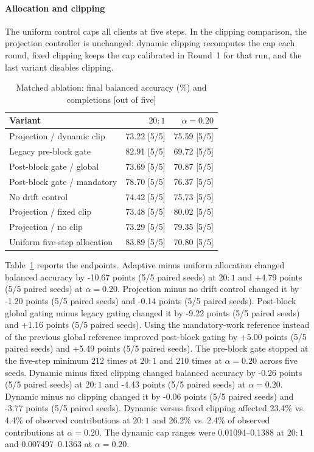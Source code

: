 \documentclass[conference]{IEEEtran}
\begin{document}
\paragraph{Allocation and clipping}
The uniform control caps all clients at five steps. In the clipping comparison, the projection controller is unchanged: dynamic clipping recomputes the cap each round, fixed clipping keeps the cap calibrated in Round~1 for that run, and the last variant disables clipping.
\begin{table}[t]
\caption{Matched ablation: final balanced accuracy (\%) and completions [out of five]}
\label{tab:matched_ablation}
\centering\scriptsize
\setlength{\tabcolsep}{3.8pt}
\begin{tabular}{@{}lrr@{}}\toprule
Variant & $20{:}1$ & $\alpha=0.20$\\\midrule
Projection / dynamic clip & 73.22 [5/5] & 75.59 [5/5]\\
Legacy pre-block gate & 82.91 [5/5] & 69.72 [5/5]\\
Post-block gate / global & 73.69 [5/5] & 70.87 [5/5]\\
Post-block gate / mandatory & 78.70 [5/5] & 76.37 [5/5]\\
No drift control & 74.42 [5/5] & 75.73 [5/5]\\
Projection / fixed clip & 73.48 [5/5] & 80.02 [5/5]\\
Projection / no clip & 73.29 [5/5] & 79.35 [5/5]\\
Uniform five-step allocation & 83.89 [5/5] & 70.80 [5/5]\\
\bottomrule\end{tabular}
\end{table}
Table~\ref{tab:matched_ablation} reports the endpoints. Adaptive minus uniform allocation changed balanced accuracy by -10.67 points (5/5 paired seeds) at $20{:}1$ and +4.79 points (5/5 paired seeds) at $\alpha=0.20$. Projection minus no drift control changed it by -1.20 points (5/5 paired seeds) and -0.14 points (5/5 paired seeds). Post-block global gating minus legacy gating changed it by -9.22 points (5/5 paired seeds) and +1.16 points (5/5 paired seeds). Using the mandatory-work reference instead of the previous global reference improved post-block gating by +5.00 points (5/5 paired seeds) and +5.49 points (5/5 paired seeds). The pre-block gate stopped at the five-step minimum 212 times at $20{:}1$ and 210 times at $\alpha=0.20$ across five seeds.
Dynamic minus fixed clipping changed balanced accuracy by -0.26 points (5/5 paired seeds) at $20{:}1$ and -4.43 points (5/5 paired seeds) at $\alpha=0.20$. Dynamic minus no clipping changed it by -0.06 points (5/5 paired seeds) and -3.77 points (5/5 paired seeds). Dynamic versus fixed clipping affected 23.4\% vs. 4.4\% of observed contributions at $20{:}1$ and 26.2\% vs. 2.4\% of observed contributions at $\alpha=0.20$. The dynamic cap ranges were 0.01094--0.1388 at $20{:}1$ and 0.007497--0.1363 at $\alpha=0.20$.
\end{document}
